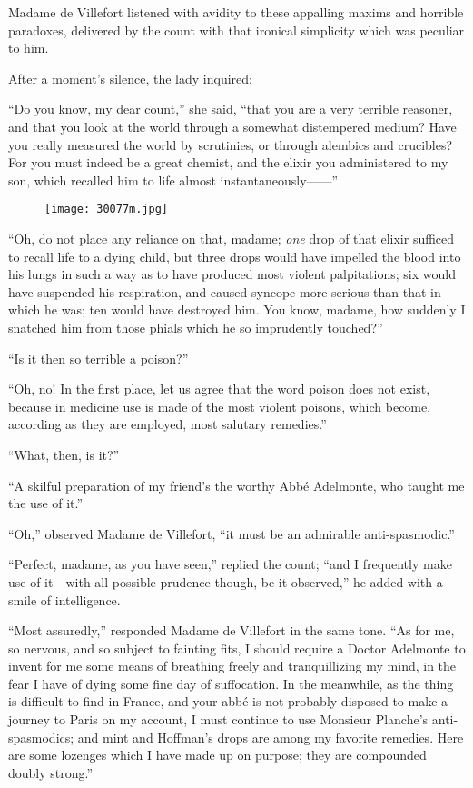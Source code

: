 Madame de Villefort listened with avidity to these appalling maxims and
horrible paradoxes, delivered by the count with that ironical
simplicity which was peculiar to him.

After a moment’s silence, the lady inquired:

“Do you know, my dear count,” she said, “that you are a very terrible
reasoner, and that you look at the world through a somewhat distempered
medium? Have you really measured the world by scrutinies, or through
alembics and crucibles? For you must indeed be a great chemist, and the
elixir you administered to my son, which recalled him to life almost
instantaneously——”

\begin{figure}[ht]
\texttt{[image: 30077m.jpg]}
\end{figure}

“Oh, do not place any reliance on that, madame; \textit{one} drop of that
elixir sufficed to recall life to a dying child, but three drops would
have impelled the blood into his lungs in such a way as to have
produced most violent palpitations; six would have suspended his
respiration, and caused syncope more serious than that in which he was;
ten would have destroyed him. You know, madame, how suddenly I snatched
him from those phials which he so imprudently touched?”

“Is it then so terrible a poison?”

“Oh, no! In the first place, let us agree that the word poison does not
exist, because in medicine use is made of the most violent poisons,
which become, according as they are employed, most salutary remedies.”

“What, then, is it?”

“A skilful preparation of my friend’s the worthy Abbé Adelmonte, who
taught me the use of it.”

“Oh,” observed Madame de Villefort, “it must be an admirable
anti-spasmodic.”

“Perfect, madame, as you have seen,” replied the count; “and I
frequently make use of it—with all possible prudence though, be it
observed,” he added with a smile of intelligence.

“Most assuredly,” responded Madame de Villefort in the same tone. “As
for me, so nervous, and so subject to fainting fits, I should require a
Doctor Adelmonte to invent for me some means of breathing freely and
tranquillizing my mind, in the fear I have of dying some fine day of
suffocation. In the meanwhile, as the thing is difficult to find in
France, and your abbé is not probably disposed to make a journey to
Paris on my account, I must continue to use Monsieur Planche’s
anti-spasmodics; and mint and Hoffman’s drops are among my favorite
remedies. Here are some lozenges which I have made up on purpose; they
are compounded doubly strong.”

